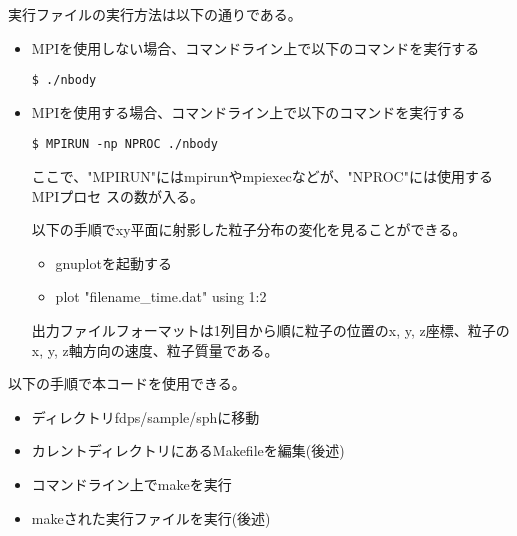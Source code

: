 実行ファイルの実行方法は以下の通りである。
\begin{itemize}
\item MPIを使用しない場合、コマンドライン上で以下のコマンドを実行する
\begin{screen}
\begin{verbatim}
$ ./nbody
\end{verbatim}
\end{screen}
  
\item MPIを使用する場合、コマンドライン上で以下のコマンドを実行する
\begin{screen}
\begin{verbatim}
$ MPIRUN -np NPROC ./nbody
\end{verbatim}
\end{screen}
ここで、"MPIRUN"にはmpirunやmpiexecなどが、"NPROC"には使用するMPIプロセ
スの数が入る。

以下の手順でxy平面に射影した粒子分布の変化を見ることができる。
\begin{itemize}
\item gnuplotを起動する
\item plot "filename\_time.dat" using 1:2
\end{itemize}
出力ファイルフォーマットは1列目から順に粒子の位置のx, y, z座標、粒子の
x, y, z軸方向の速度、粒子質量である。

\end{itemize}


以下の手順で本コードを使用できる。
\begin{itemize}
\item ディレクトリfdps/sample/sphに移動
\item カレントディレクトリにあるMakefileを編集(後述)
\item コマンドライン上でmakeを実行
\item makeされた実行ファイルを実行(後述)
\end{itemize}

